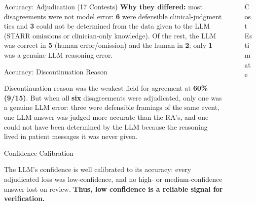 \documentclass[final]{beamer}
\newlength{\sepwidth}
\newlength{\colnarrow}  %
\newcommand{\separatorcolumn}{\begin{column}{\sepwidth}\end{column}}
\begin{document}
\begin{frame}[t]
\begin{columns}[t]
\begin{column}{\colnarrow}
\begin{block}{Accuracy: Adjudication (17 Contests)}
\textbf{Why they differed:} most disagreements were not model error: \textbf{6}
were defensible clinical-judgment ties and \textbf{3} could not be determined
from the data given to the LLM (STARR omissions or clinician-only knowledge). Of
the rest, the LLM was correct in \textbf{5} (human error/omission) and the human in \textbf{2}; only \textbf{1} was a
genuine LLM reasoning error.
\vspace{-0.4em}
\end{block}

\begin{block}{Accuracy: Discontinuation Reason}
  \vspace{0.3em}
  \begin{center}
    
  \end{center}
Discontinuation reason was the weakest field for agreement at \textbf{60\%
(9/15)}. But when all \textbf{six} disagreements were adjudicated, only one was
a genuine LLM error: three were defensible framings of the same event, one LLM
answer was judged more accurate than the RA's, and one could not have been
determined by the LLM because the reasoning lived in patient messages it was
never given.
\vspace{-0.6em}
\end{block}

 \begin{block}{Confidence Calibration}
   \vspace{-0.4em}
  \begin{center}
    
  \end{center}

  \vspace{0.2em}
 The LLM's confidence is well calibrated to its accuracy: every adjudicated loss
was low-confidence, and no high- or medium-confidence answer lost on review.
\textbf{Thus, low confidence is a reliable signal for verification.}
\end{block}

\end{column}

\separatorcolumn

\begin{column}{\colnarrow}   %

  \begin{block}{Cost Estimate}


\end{block}
\end{column}
\end{columns}
\end{frame}
\end{document}
